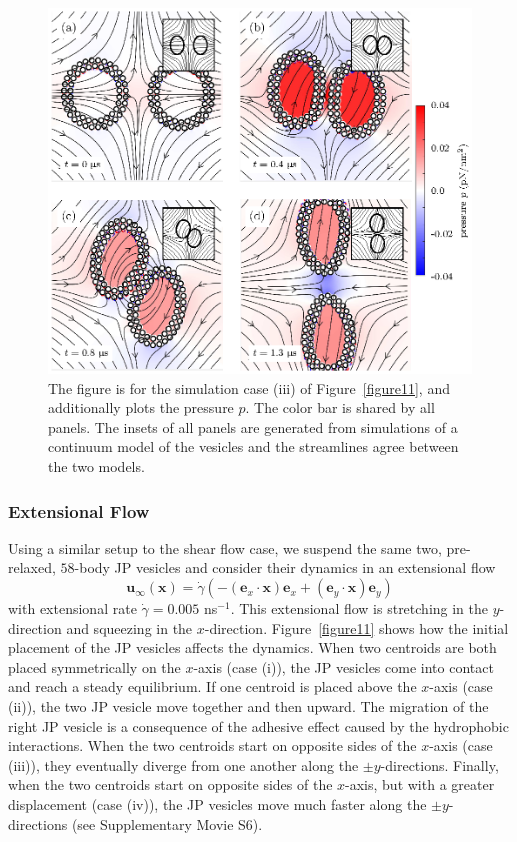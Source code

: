 \documentclass[lineno]{jfm}
\newcommand{\xx}{\mathbf{x}}
\newcommand{\uu}{\mathbf{u}}
\begin{document}
\begin{figure}
  \centering
  \includegraphics[width=\textwidth]{fig12.eps}
  \caption{\label{figure12} The figure is for the simulation case (iii) of Figure~\ref{figure11},
  and additionally plots the pressure $p$.  The color bar is shared by all panels. 
  The insets of all panels are generated from simulations of a continuum
  model of the vesicles and the streamlines agree between the two models.}
\end{figure}



\subsubsection{Extensional Flow}

Using a similar setup to the shear flow case, we suspend the same two,
pre-relaxed, $58$-body JP vesicles and consider their dynamics in an
extensional flow 
\begin{equation}
\uu_{\infty}(\xx) = \dot \gamma (-(\mathbf{e}_x \cdot \xx)\mathbf{e}_x + (\mathbf{e}_y \cdot \xx)\mathbf{e}_y)
\end{equation}
with extensional rate $\dot \gamma =0.005$ ns$^{-1}$. This extensional
flow is stretching in the $y$-direction and squeezing in the
$x$-direction. Figure~\ref{figure11} shows how the initial placement of
the JP vesicles affects the dynamics. When two centroids are both placed
symmetrically on the $x$-axis (case (i)), the JP vesicles come into
contact and reach a steady equilibrium. If one centroid is placed above
the $x$-axis (case (ii)), the two JP vesicle move together and then
upward. The migration of the right JP vesicle is a consequence of the
adhesive effect caused by the hydrophobic interactions. When the two
centroids start on opposite sides of the $x$-axis (case (iii)), they
eventually diverge from one another along the $\pm y$-directions.
Finally, when the two centroids start on opposite sides of the $x$-axis,
but with a greater displacement (case (iv)), the JP vesicles move much
faster along the $\pm y$-directions (see Supplementary Movie S6). 
\end{document}
